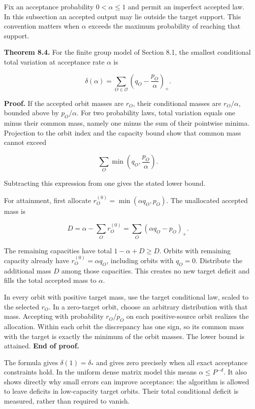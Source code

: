 \documentclass[
]{article}
\begin{document}
Fix an acceptance probability \(0<\alpha\le1\) and permit an imperfect
accepted law. In this subsection an accepted output may lie outside the
target support. This convention matters when \(\alpha\) exceeds the
maximum probability of reaching that support.

\textbf{Theorem 8.4.} For the finite group model of Section 8.1, the
smallest conditional total variation at acceptance rate \(\alpha\) is

\[
\delta(\alpha)=
\sum_{O\in\mathscr O}
\left(q_O-\frac{p_O}{\alpha}\right)_+.
\]

\textbf{Proof.} If the accepted orbit masses are \(r_O\), their
conditional masses are \(r_O/\alpha\), bounded above by \(p_O/\alpha\).
For two probability laws, total variation equals one minus their common
mass, namely one minus the sum of their pointwise minima. Projection to
the orbit index and the capacity bound show that common mass cannot
exceed

\[
\sum_O\min\left(q_O,\frac{p_O}{\alpha}\right).
\]

Subtracting this expression from one gives the stated lower bound.

For attainment, first allocate \(r_O^{(0)}=\min(\alpha q_O,p_O)\). The
unallocated accepted mass is

\[
D=\alpha-\sum_O r_O^{(0)}
=\sum_O(\alpha q_O-p_O)_+.
\]

The remaining capacities have total \(1-\alpha+D\ge D\). Orbits with
remaining capacity already have \(r_O^{(0)}=\alpha q_O\), including
orbits with \(q_O=0\). Distribute the additional mass \(D\) among those
capacities. This creates no new target deficit and fills the total
accepted mass to \(\alpha\).

In every orbit with positive target mass, use the target conditional
law, scaled to the selected \(r_O\). In a zero-target orbit, choose an
arbitrary distribution with that mass. Accepting with probability
\(r_O/p_O\) on each positive-source orbit realizes the allocation.
Within each orbit the discrepancy has one sign, so its common mass with
the target is exactly the minimum of the orbit masses. The lower bound
is attained. \textbf{End of proof.}

The formula gives \(\delta(1)=\delta_*\) and gives zero precisely when
all exact acceptance constraints hold. In the uniform dense matrix model
this means \(\alpha\le P^{-d}\). It also shows directly why small errors
can improve acceptance: the algorithm is allowed to leave deficits in
low-capacity target orbits. Their total conditional deficit is measured,
rather than required to vanish.
\end{document}
